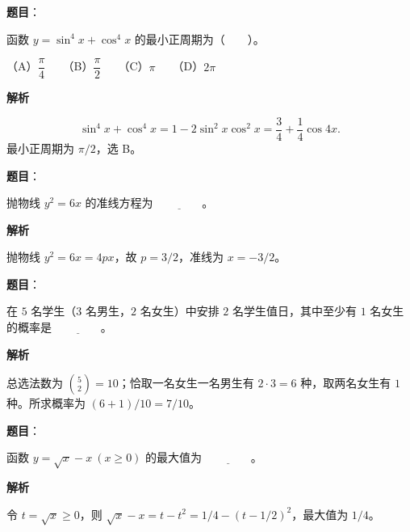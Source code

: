 \begin{answer}

\textbf{题目}：

函数 $y=\sin^4x+\cos^4x$ 的最小正周期为\mbox{（　　）}。

（A）$\dfrac{\pi}{4}$　　（B）$\dfrac{\pi}{2}$　　（C）$\pi$　　（D）$2\pi$

\textbf{解析}

\nopagebreak[4]
\[
\sin^4x+\cos^4x=1-2\sin^2x\cos^2x
=\frac34+\frac14\cos4x.
\]
最小正周期为 $\pi/2$，选 B。


\end{answer}
\begin{answer}

\textbf{题目}：

抛物线 $y^2=6x$ 的准线方程为 $\underline{\qquad\qquad}$。

\textbf{解析}

抛物线 $y^2=6x=4px$，故 $p=3/2$，准线为 $x=-3/2$。


\end{answer}
\begin{answer}

\textbf{题目}：

在 $5$ 名学生（$3$ 名男生，$2$ 名女生）中安排 $2$ 名学生值日，其中至少有 $1$ 名女生的概率是 $\underline{\qquad\qquad}$。

\textbf{解析}

总选法数为 $\binom52=10$；恰取一名女生一名男生有 $2\cdot3=6$ 种，取两名女生有 $1$ 种。所求概率为 $(6+1)/10=7/10$。


\end{answer}
\begin{answer}

\textbf{题目}：

函数 $y=\sqrt{x}-x\ (x\geq 0)$ 的最大值为 $\underline{\qquad\qquad}$。

\textbf{解析}

令 $t=\sqrt{x}\ge0$，则 $\sqrt{x}-x=t-t^2=1/4-(t-1/2)^2$，最大值为 $1/4$。


\end{answer}
